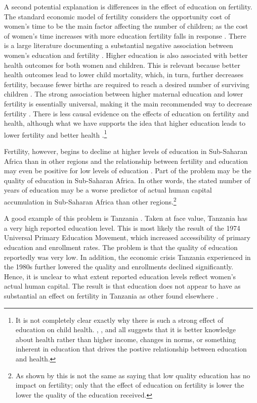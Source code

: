 A second potential explanation is differences in the effect of education on fertility. The standard economic model of fertility considers the opportunity cost of women's time to be the main factor affecting the number of children; as the cost of women's time increases with more education fertility falls in response \citep{becker91}. There is a large literature documenting a substantial negative association between women's education and fertility \citep{strauss95}. Higher education is also associated with better health outcomes for both women and children. This is relevant because better health outcomes lead to lower child mortality, which, in turn, further decreases fertility, because fewer births are required to reach a desired number of surviving children \citep{Ainsworth1996}. The strong association between higher maternal education and lower fertility is essentially universal, making it the main recommended way to decrease fertility \citep{schultz02}. There is less causal evidence on the effects of education on fertility and health, although what we have supports the idea that higher education leads to lower fertility and better health \citep{Breierova2004,Behrman2015,Keats2016,Ozier2016}.\footnote{It is not completely clear exactly why there is such a strong effect of education on child health. \citet{Thomas1991}, \citet{Glewwe1999}, and \citet{Kovsted2002} all suggests that it is better knowledge about health rather than higher income, changes in norms, or something inherent in education that drives the postive relationship between education and health.}

Fertility, however, begins to decline at higher levels of education in Sub-Saharan Africa than in other regions and the relationship between fertility and education may even be positive for low levels of education \citep{Ainsworth1996,Benefo1996,Thomas1996}. Part of the problem may be the quality of education in Sub-Saharan Africa. In other words, the stated number of years of education may be a worse predictor of actual human capital accumulation in Sub-Saharan Africa than other regions.\footnote{As shown by \citet{Oye2016} this is not the same as saying that low quality education has no impact on fertility; only that the effect of education on fertility is lower the lower the quality of the education received.}

A good example of this problem is Tanzania \citep{Galabawa2001,Wedgwood2005}. Taken at face value, Tanzania has a very high reported education level. This is most likely the result of the 1974 Universal Primary Education Movement, which increased accessibility of primary education and enrollment rates. The problem is that the quality of education reportedly was very low. In addition, the economic crisis Tanzania experienced in the 1980s further lowered the quality and enrollments declined significantly. Hence, it is unclear to what extent reported education levels reflect women's actual human capital. The result is that education does not appear to have as substantial an effect on fertility in Tanzania as other found elsewhere \citep{Alam2016}.

